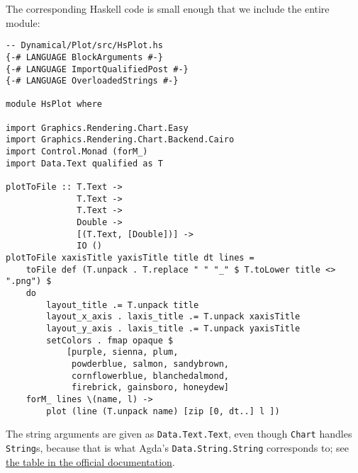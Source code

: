 The corresponding Haskell code is small enough that we include the entire module:

\begin{verbatim}
-- Dynamical/Plot/src/HsPlot.hs
{-# LANGUAGE BlockArguments #-}
{-# LANGUAGE ImportQualifiedPost #-}
{-# LANGUAGE OverloadedStrings #-}

module HsPlot where

import Graphics.Rendering.Chart.Easy
import Graphics.Rendering.Chart.Backend.Cairo
import Control.Monad (forM_)
import Data.Text qualified as T

plotToFile :: T.Text ->
              T.Text -> 
              T.Text -> 
              Double -> 
              [(T.Text, [Double])] -> 
              IO ()
plotToFile xaxisTitle yaxisTitle title dt lines = 
    toFile def (T.unpack . T.replace " " "_" $ T.toLower title <> ".png") $ 
    do
        layout_title .= T.unpack title
        layout_x_axis . laxis_title .= T.unpack xaxisTitle
        layout_y_axis . laxis_title .= T.unpack yaxisTitle
        setColors . fmap opaque $ 
            [purple, sienna, plum, 
             powderblue, salmon, sandybrown, 
             cornflowerblue, blanchedalmond, 
             firebrick, gainsboro, honeydew]
    forM_ lines \(name, l) ->
        plot (line (T.unpack name) [zip [0, dt..] l ])
\end{verbatim}

The string arguments are given as \texttt{Data.Text.Text}, even though \texttt{Chart} handles \texttt{String}s, because that is what Agda's \texttt{Data.String.String} corresponds to; see \href{https://agda.readthedocs.io/en/v2.6.2.2/language/foreign-function-interface.html#built-in-types}{the table in the official documentation}.

